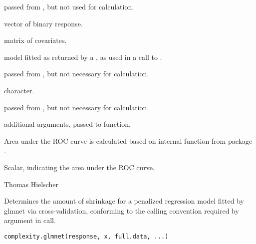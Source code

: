 \documentclass[letterpaper]{book}
\begin{document}
\begin{Arguments}
\begin{ldescription}
\item[\code{full.data}] passed from , but not used for calculation.
\item[\code{response}] vector of binary response.
\item[\code{x}]  matrix of covariates.
\item[\code{model}] model fitted as returned by a , as used in a call to .
\item[\code{cplx}] passed from , but not necessary for calculation.
\item[\code{type}] character.
\item[\code{fullsample.attr}] passed from , but not necessary for calculation.
\item[\code{...}] additional arguments, passed to  function.
\end{ldescription}
\end{Arguments}
%
\begin{Details}\relax
Area under the ROC curve is calculated based on internal  function from package .

\end{Details}
%
\begin{Value}
Scalar, indicating the area under the ROC curve.
\end{Value}
%
\begin{Author}\relax
Thomas Hielscher \bsl{}
\end{Author}
%
\begin{SeeAlso}\relax
{}
\end{SeeAlso}
%
\begin{Description}\relax
Determines the amount of shrinkage for a penalized regression model fitted by glmnet via cross-validation, conforming to the calling convention required by argument  in  call. 
\end{Description}
%
\begin{Usage}
\begin{verbatim}
complexity.glmnet(response, x, full.data, ...)
\end{verbatim}
\end{Usage}
\end{document}
